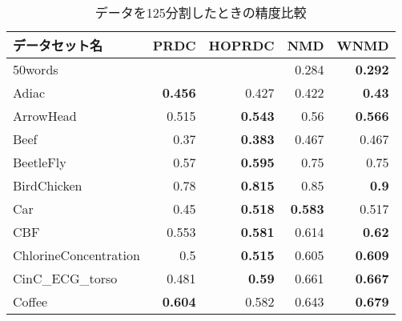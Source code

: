 \begin{longtable}{|l||r|r||r|r|}
\caption{データを125分割したときの精度比較}
\\
\hline
\textbf{データセット名} &
\multicolumn{1}{l|}{\textbf{ PRDC}} &
\multicolumn{1}{l||}{\textbf{HOPRDC}} &
\multicolumn{1}{l|}{\textbf{NMD}} &
\multicolumn{1}{l|}{\textbf{ WNMD}}
\bigstrut\\
\hline
\endhead
\rowcolor[rgb]{ .851,  .851,  .851} 50words &
&
&
0.284 &
\cellcolor[rgb]{ .973,  .796,  .678} \textbf{0.292}
\bigstrut\\
\hline
Adiac &
\cellcolor[rgb]{ .973,  .796,  .678} \textbf{0.456} &
0.427 &
0.422 &
\cellcolor[rgb]{ .973,  .796,  .678} \textbf{0.43}
\bigstrut\\
\hline
\rowcolor[rgb]{ .851,  .851,  .851} ArrowHead &
0.515 &
\cellcolor[rgb]{ .973,  .796,  .678} \textbf{0.543} &
0.56 &
\cellcolor[rgb]{ .973,  .796,  .678} \textbf{0.566}
\bigstrut\\
\hline
Beef &
0.37 &
\cellcolor[rgb]{ .973,  .796,  .678} \textbf{0.383} &
0.467 &
0.467
\bigstrut\\
\hline
\rowcolor[rgb]{ .851,  .851,  .851} BeetleFly &
0.57 &
\cellcolor[rgb]{ .973,  .796,  .678} \textbf{0.595} &
0.75 &
0.75
\bigstrut\\
\hline
BirdChicken &
0.78 &
\cellcolor[rgb]{ .973,  .796,  .678} \textbf{0.815} &
0.85 &
\cellcolor[rgb]{ .973,  .796,  .678} \textbf{0.9}
\bigstrut\\
\hline
\rowcolor[rgb]{ .851,  .851,  .851} Car &
0.45 &
\cellcolor[rgb]{ .973,  .796,  .678} \textbf{0.518} &
\cellcolor[rgb]{ .973,  .796,  .678} \textbf{0.583} &
0.517
\bigstrut\\
\hline
CBF &
0.553 &
\cellcolor[rgb]{ .973,  .796,  .678} \textbf{0.581} &
0.614 &
\cellcolor[rgb]{ .973,  .796,  .678} \textbf{0.62}
\bigstrut\\
\hline
\rowcolor[rgb]{ .851,  .851,  .851} ChlorineConcentration &
0.5 &
\cellcolor[rgb]{ .973,  .796,  .678} \textbf{0.515} &
0.605 &
\cellcolor[rgb]{ .973,  .796,  .678} \textbf{0.609}
\bigstrut\\
\hline
CinC\_ECG\_torso &
0.481 &
\cellcolor[rgb]{ .973,  .796,  .678} \textbf{0.59} &
0.661 &
\cellcolor[rgb]{ .973,  .796,  .678} \textbf{0.667}
\bigstrut\\
\hline
\rowcolor[rgb]{ .851,  .851,  .851} Coffee &
\cellcolor[rgb]{ .973,  .796,  .678} \textbf{0.604} &
0.582 &
0.643 &
\cellcolor[rgb]{ .973,  .796,  .678} \textbf{0.679}
\bigstrut\\

\end{longtable}

